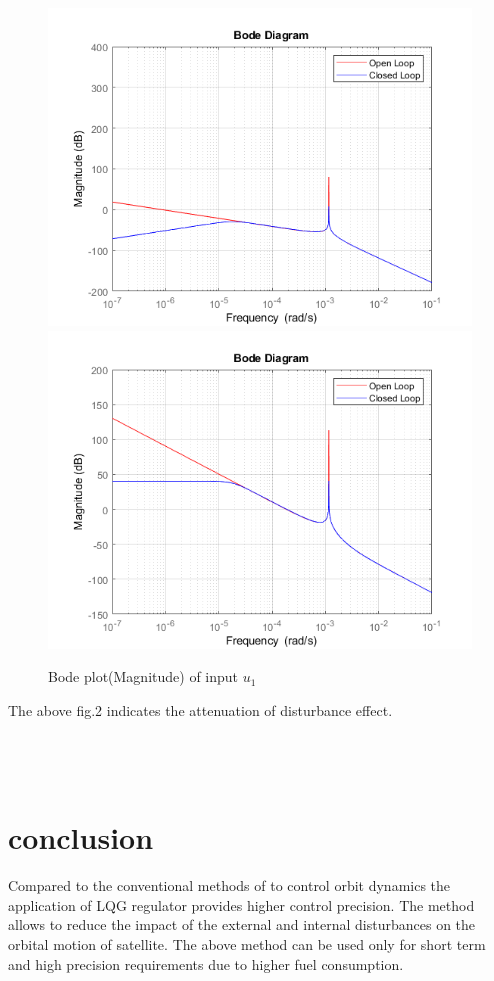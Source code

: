\documentclass[journal,onecolumn]{IEEEtran}
\begin{document}
\begin{figure}[h]
\includegraphics[scale=0.5]{opvsip1.png}
\includegraphics[scale=0.5]{opvsip2.png}
\centering
\caption{Bode plot(Magnitude) of input $u_1$}

\end{figure}

The above fig.2 indicates the attenuation of disturbance effect.
\\
\\
\\
\\
\section{conclusion}
Compared to the conventional methods of to control orbit dynamics the application of LQG regulator provides higher control precision. The method allows to reduce the impact of the external and internal disturbances on the orbital motion of satellite. The above method can be used only for short term and high precision requirements due to higher fuel consumption.
\end{document}
